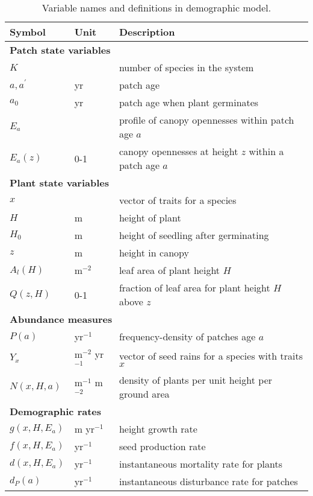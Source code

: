 \documentclass[10pt,twoside]{article}
\begin{document}
\begin{table}[ht]
 \caption{Variable names and definitions in demographic model.}
\centering
  \begin{tabular}{p{2cm}p{2cm}p{9cm}}
  \hline
  Symbol & Unit & Description \\
  \hline
  \multicolumn{3}{l}{\textbf{Patch state variables}} \\
  $K$   & & number of species in the system \\
  $a, a^{\prime}$ & yr & patch age \\
  $a_0$ & yr & patch age when plant germinates \\
  $E_a$ & & profile of canopy opennesses within patch age $a$\\
  $E_a(z)$& 0-1 & canopy opennesses at height $z$ within a patch age $a$\\

  \multicolumn{3}{l}{\textbf{Plant state variables}} \\
  $x$   & & vector of traits for a species\\
  $H$   & m & height of plant\\
  $H_0$   & m  & height of seedling after germinating\\
  $z$   & m & height in canopy\\
  $A_l(H)$  & m$^{-2}$ & leaf area of plant height $H$ \\
  $Q(z, H)$ & 0-1 & fraction of leaf area for plant height $H$ above $z$\\

  \multicolumn{3}{l}{\textbf{Abundance measures}} \\
  $P(a)$ & yr$^{-1}$ & frequency-density of patches age $a$ \\
  $Y_x$ & m$^{-2}$ yr$^{-1}$ & vector of seed rains for a species with traits $x$\\
  $N(x, H, a)$ & m$^{-1}$ m$^{-2}$ & density of plants per unit height per ground area\\

  \multicolumn{3}{l}{\textbf{Demographic rates}} \\
  $g(x, H, E_a)$ & m yr$^{-1}$ & height growth rate \\
  $f(x, H, E_a)$ & yr$^{-1}$ & seed production rate \\
  $d(x, H, E_a)$ & yr$^{-1}$ & instantaneous mortality rate for plants\\
  $d_P(a)$ & yr$^{-1}$ & instantaneous disturbance rate for patches\\


\end{tabular}
\end{table}
\end{document}
